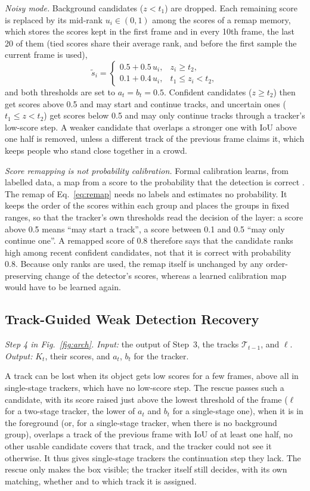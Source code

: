 \documentclass[pdflatex,sn-mathphys-num,iicol]{sn-jnl}
\begin{document}
\emph{Noisy mode.} Background candidates ($z<t_1$) are dropped. Each remaining score is
replaced by its mid-rank $u_i\in(0,1)$ among the scores of a remap memory, which stores the scores
kept in the first frame and in every 10th frame, the last 20 of them (tied scores share their
average rank, and before the first sample the current frame is used),
\begin{equation}
\tilde{s}_i=
\begin{cases}
0.5+0.5\,u_i, & z_i\ge t_2,\\
0.1+0.4\,u_i, & t_1\le z_i<t_2,
\end{cases}
\label{eq:remap}
\end{equation}
and both thresholds are set to $a_t=b_t=0.5$. Confident candidates ($z\ge t_2$) then get scores above 0.5
and may start and continue tracks, and uncertain ones ($t_1\le z<t_2$) get scores below 0.5 and may
only continue tracks through a tracker's low-score step. A weaker
candidate that overlaps a stronger one with IoU above one half is removed, unless a different track
of the previous frame claims it, which keeps people who stand close together in a crowd.

\emph{Score remapping is not probability calibration.} Formal calibration learns, from labelled
data, a map from a score to the probability that the detection is correct \cite{kuppers2020detcalib}.
The remap of Eq.~\eqref{eq:remap} needs no labels and estimates no probability. It keeps the order
of the scores within each group and places the groups in fixed ranges, so that the tracker's own
thresholds read the decision of the layer: a score above 0.5 means ``may start a track'', a score
between 0.1 and 0.5 ``may only continue one''. A remapped score of 0.8 therefore says that the
candidate ranks high among recent confident candidates, not that it is correct with probability
0.8. Because only ranks are used, the remap itself is unchanged by any order-preserving change of
the detector's scores, whereas a learned calibration map would have to be learned again.

\subsection{Track-Guided Weak Detection Recovery}\label{sec:rescue}
\emph{Step 4 in Fig.~\ref{fig:arch}. Input:} the output of Step~3, the tracks $\mathcal{T}_{t-1}$, and $\ell$. \emph{Output:}
$K_t$, their scores, and $a_t$, $b_t$ for the tracker.

A track can be lost when its object gets low scores for a few frames, above all in single-stage
trackers, which have no low-score step. The rescue passes such a candidate, with its score raised
just above the lowest threshold of the frame ($\ell$ for a two-stage tracker, the lower of $a_t$
and $b_t$ for a single-stage one), when it is in the foreground (or, for a single-stage tracker,
when there is no background group), overlaps a track of the previous frame with IoU of at least
one half, no other usable candidate covers that track, and the tracker could not see it otherwise.
It thus gives single-stage trackers the continuation step they lack. The rescue only makes the box
visible; the tracker itself still decides, with its own matching, whether and to which track it is
assigned.
\end{document}
